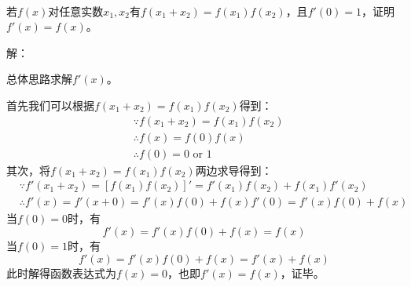 ~

\begin{exercise}
若$f\left( x \right) $对任意实数$x_1,x_2$有$f\left( x_1+x_2 \right) =f\left( x_1 \right) f\left( x_2 \right) $，且$f'\left( 0 \right) =1$，证明$f'\left( x \right) =f\left( x \right) $。
\end{exercise}

解：

总体思路求解$f'\left( x \right) $。

首先我们可以根据$f\left( x_1+x_2 \right) =f\left( x_1 \right) f\left( x_2 \right) $得到：
\begin{align*}
&\because f\left( x_1+x_2 \right) =f\left( x_1 \right) f\left( x_2 \right) \\
&\therefore f\left( x \right) =f\left( 0 \right) f\left( x \right) \\
&\therefore f\left( 0 \right) =0\,\,\mathrm{or}\,\,1
\end{align*}
其次，将$f\left( x_1+x_2 \right) =f\left( x_1 \right) f\left( x_2 \right) $两边求导得到：
\begin{align*}
&\because f'\left( x_1+x_2 \right) =\left[ f\left( x_1 \right) f\left( x_2 \right) \right] '=f'\left( x_1 \right) f\left( x_2 \right) +f\left( x_1 \right) f'\left( x_2 \right) \\
&\therefore f'\left( x \right) =f'\left( x+0 \right) =f'\left( x \right) f\left( 0 \right) +f\left( x \right) f'\left( 0 \right) =f'\left( x \right) f\left( 0 \right) +f\left( x \right)
\end{align*}
当$f\left( 0 \right) =0$时，有
\[
f'\left( x \right) =f'\left( x \right) f\left( 0 \right) +f\left( x \right) =f\left( x \right)
\]
当$f\left( 0 \right) =1$时，有
\[
f'\left( x \right) =f'\left( x \right) f\left( 0 \right) +f\left( x \right) =f'\left( x \right) +f\left( x \right)
\]
此时解得函数表达式为$f\left( x \right) =0$，也即$f'\left( x \right) =f\left( x \right) $，证毕。




